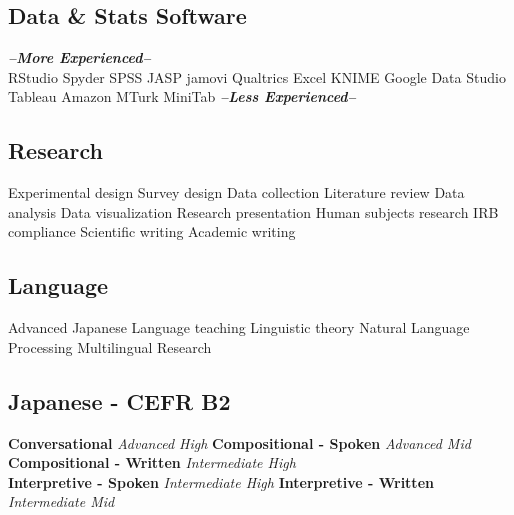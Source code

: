 \documentclass[letterpaper]{deedy-resume_sm} %
\begin{document}
\subsection{Data \& Stats Software}
{\footnotesize \textit{\textbf{--More Experienced--}}}\\
RStudio \textbullet{} Spyder \textbullet{} SPSS \textbullet{} JASP \textbullet{} jamovi \textbullet{} Qualtrics \textbullet{} Excel \textbullet{} KNIME \textbullet{} Google Data Studio \textbullet{} Tableau \textbullet{} Amazon MTurk \textbullet{} MiniTab
{\footnotesize \textit{\textbf{--Less Experienced--}}}\\
\sectionspace
\subsection{Research}
Experimental design \textbullet{} Survey design \textbullet{} Data collection \textbullet{} Literature review \textbullet{} Data analysis \textbullet{} Data visualization \textbullet{} Research presentation \textbullet{} Human subjects research \textbullet{} IRB compliance \textbullet{} Scientific writing  \textbullet{} Academic writing
\sectionspace
\subsection{Language}
Advanced Japanese \textbullet{} Language teaching \textbullet{} Linguistic theory \textbullet{} Natural Language Processing \textbullet{} Multilingual Research\\
\sectionspace 
\subsection{Japanese - CEFR B2}
\textbf{Conversational} {\footnotesize \textit{Advanced High}} \textbullet{}
\textbf{Compositional - Spoken} {\footnotesize \textit{Advanced Mid}} \textbullet{}
\textbf{Compositional - Written} {\footnotesize \textit{Intermediate High}} \\
\textbf{Interpretive - Spoken} {\footnotesize \textit{Intermediate High}} \textbullet{}
\textbf{Interpretive - Written} {\footnotesize \textit{Intermediate Mid}}
\sectionspace 

\end{document}
